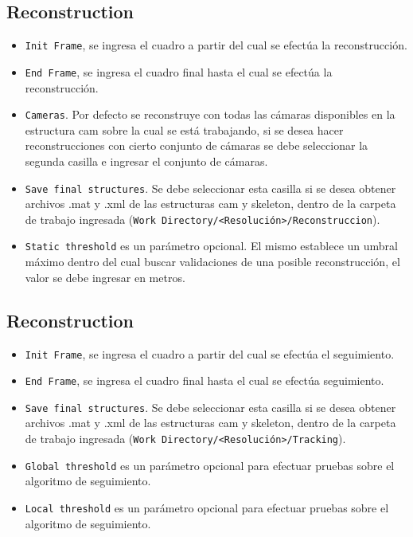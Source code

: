  \subsection{Reconstruction}
 \begin{itemize}
    \item \texttt{Init Frame}, se ingresa el cuadro a partir del cual se efectúa la reconstrucción. 
    \item \texttt{End Frame}, se ingresa el cuadro final hasta el cual se efectúa la reconstrucción. 
    \item \texttt{Cameras}. Por defecto se reconstruye con todas las cámaras disponibles en la estructura cam sobre la cual se está trabajando, si se desea hacer reconstrucciones con cierto conjunto de cámaras se debe seleccionar la segunda casilla e ingresar el conjunto de cámaras.
    \item \texttt{Save final structures}. Se debe seleccionar esta casilla si se desea obtener archivos .mat y .xml de las estructuras  cam y skeleton, dentro de la carpeta  de trabajo ingresada (\texttt{Work Directory/<Resolución>/Reconstruccion}).
    \item \texttt{Static threshold} es un parámetro opcional. El mismo establece un umbral máximo dentro del cual buscar validaciones de una posible  reconstrucción, el valor se debe ingresar en metros.
   \end{itemize}
 
  \subsection{Reconstruction}
  \begin{itemize}
     \item \texttt{Init Frame}, se ingresa el cuadro a partir del cual se efectúa el seguimiento. 
     \item \texttt{End Frame}, se ingresa el cuadro final hasta el cual se efectúa seguimiento.      
     \item \texttt{Save final structures}. Se debe seleccionar esta casilla si se desea obtener archivos .mat y .xml de las estructuras  cam y skeleton, dentro de la carpeta  de trabajo ingresada (\texttt{Work Directory/<Resolución>/Tracking}).
     \item \texttt{Global threshold} es un parámetro opcional para efectuar pruebas sobre el algoritmo de seguimiento.
     \item \texttt{Local threshold} es un parámetro opcional para efectuar pruebas sobre el algoritmo de seguimiento. 
   \end{itemize}
   
